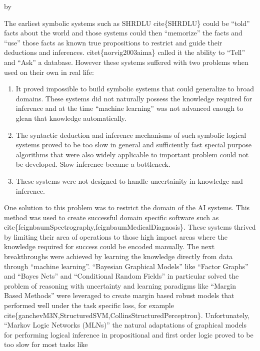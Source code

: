 \documentclass[12pt,answers]{exam} %
\makeatletter
\renewcommand{\cite}[1]{cite\{#1\}}
\newcommand{\citet}[1]{citet\{#1\}}
\def\SetTotalwidth{\advance\linewidth by \@totalleftmargin
\@totalleftmargin=0pt}
\newcommand{\answer}[1]{
\ifprintanswers
\SetTotalwidth
  \begin{solution}[0in]#1\end{solution}
\else \fi
}
\makeatother
\begin{document}
\begin{questions}
  \answer{The earliest symbolic systems such as SHRDLU \cite{SHRDLU}
    could be ``told'' facts about the world and those systems could
    then ``memorize'' the facts and ``use'' those facts as known true
    propositions to restrict and guide their deductions and
    inferences. \citet{norvig2003aima} called it the ability to
    ``Tell'' and ``Ask'' a database. However these systems suffered
    with two problems when used on their own in real life:
    \begin{enumerate}
    \item It proved impossible to build symbolic systems that could
      generalize to broad domains. These systems did not naturally
      possess the knowledge required for inference and at the time
      ``machine learning'' was not advanced enough to glean that
      knowledge automatically.
    \item The syntactic deduction and inference mechanisms of such
      symbolic logical systems proved to be too slow in general and
      sufficiently fast special purpose algorithms that were also
      widely applicable to important problem could not be
      developed. Slow inference became a bottleneck.
    \item These systems were not designed to handle uncertainity in
      knowledge and inference.
    \end{enumerate} One solution to this problem was to restrict the
    domain of the AI systems. This method was used to create
    successful domain specific software such as
    \cite{feignbaumSpectrography,feignbaumMedicalDiagnosis}. These
    systems thrived by limiting their area of operations to those high
    impact areas where the knowledge required for success could be
    encoded manually. The next breakthroughs were achieved by learning
    the knowledge directly from data through ``machine
    learning''. ``Bayesian Graphical Models'' like ``Factor Graphs''
    and ``Bayes Nets'' and ``Conditional Random Fields'' in particular
    solved the problem of reasoning with uncertainty and learning
    paradigms like ``Margin Based Methods'' were leveraged to create
    margin based robust models that performed well under the task
    specific loss, for example
    \cite{ganchevM3N,StructuredSVM,CollinsStructuredPerceptron}. Unfortunately,
    ``Markov Logic Networks (MLNs)'' the natural adaptations of
    graphical models for performing logical inference in propositional
    and first order logic proved to be too slow for most tasks like
}
\end{questions}
\end{document}

